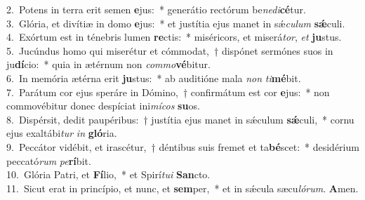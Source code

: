 {2.~}Potens in terra erit semen \textbf{e}jus:~* generátio rectórum be\textit{ne}\textit{di}\textbf{cé}tur.\\
{3.~}Glória, et divítiæ in domo \textbf{e}jus:~* et justítia ejus manet in sǽ\textit{cu}\textit{lum} \textbf{sǽ}culi.\\
{4.~}Exórtum est in ténebris lumen \textbf{re}ctis:~* miséricors, et miserá\textit{tor}, \textit{et} \textbf{ju}stus.\\
{5.~}Jucúndus homo qui miserétur et cómmodat,~† dispónet sermónes suos in ju\textbf{dí}cio:~* quia in ætérnum non \textit{com}\textit{mo}\textbf{vé}bitur.\\
{6.~}In memória ætérna erit \textbf{ju}stus:~* ab auditióne mala \textit{non} \textit{ti}\textbf{mé}bit.\\
{7.~}Parátum cor ejus speráre in Dómino,~† confirmátum est cor \textbf{e}jus:~* non commovébitur donec despíciat ini\textit{mí}\textit{cos} \textbf{su}os.\\
{8.~}Dispérsit, dedit paupéribus:~† justítia ejus manet in sǽculum \textbf{sǽ}culi,~* cornu ejus exaltábi\textit{tur} \textit{in} \textbf{gló}ria.\\
{9.~}Peccátor vidébit, et irascétur,~† déntibus suis fremet et ta\textbf{bé}scet:~* desidérium peccató\textit{rum} \textit{pe}\textbf{rí}bit.\\
{10.~}Glória Patri, et \textbf{Fí}lio,~* et Spirí\textit{tu}\textit{i} \textbf{San}cto.\\
{11.~}Sicut erat in princípio, et nunc, et \textbf{sem}per,~* et in sǽcula sæcu\textit{ló}\textit{rum}. \textbf{A}men.\\
